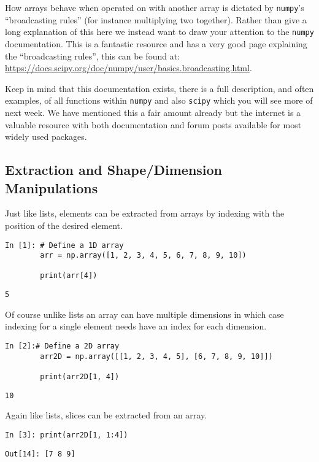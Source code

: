 How arrays behave when operated on with another array is dictated by \texttt{numpy}'s ``broadcasting rules'' (for instance multiplying two together). Rather than give a long explanation of this here we instead want to draw your attention to the \texttt{numpy} documentation. This is a fantastic resource and has a very good page explaining the ``broadcasting rules'', this can be found at: \url{https://docs.scipy.org/doc/numpy/user/basics.broadcasting.html}. 

Keep in mind that this documentation exists, there is a full description, and often examples, of all functions within \texttt{numpy} and also \texttt{scipy} which you will see more of next week. We have mentioned this a fair amount already but the internet is a valuable resource with both documentation and forum posts available for most widely used packages.
\newpage
\subsection{Extraction and Shape/Dimension Manipulations}

Just like lists, elements can be extracted from arrays by indexing with the position of the desired element. 
\begin{lstlisting}[style=PY]
In [1]: # Define a 1D array
        arr = np.array([1, 2, 3, 4, 5, 6, 7, 8, 9, 10])
        
        print(arr[4])
\end{lstlisting}
\begin{lstlisting}[style=PY, backgroundcolor=\color{white}]
        5
\end{lstlisting}

Of course unlike lists an array can have multiple dimensions in which case indexing for a single element needs have an index for each dimension.

\begin{lstlisting}[style=PY]
In [2]:# Define a 2D array
        arr2D = np.array([[1, 2, 3, 4, 5], [6, 7, 8, 9, 10]])
        
        print(arr2D[1, 4])
\end{lstlisting}
\begin{lstlisting}[style=PY, backgroundcolor=\color{white}]
        10
\end{lstlisting}

Again like lists, slices can be extracted from an array.

\begin{lstlisting}[style=PY]
In [3]: print(arr2D[1, 1:4])
\end{lstlisting}
\begin{lstlisting}[style=PY, backgroundcolor=\color{white}]
Out[14]: [7 8 9]
\end{lstlisting}

